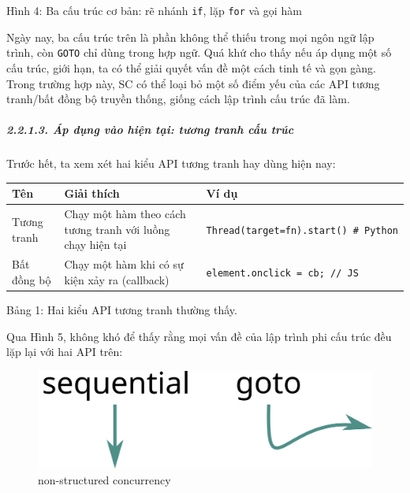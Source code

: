 \documentclass[
]{article}
\begin{document}
Hình 4: Ba cấu trúc cơ bản: rẽ nhánh \texttt{if}, lặp \texttt{for} và
gọi hàm

Ngày nay, ba cấu trúc trên là phần không thể thiếu trong mọi ngôn ngữ
lập trình, còn \texttt{GOTO} chỉ dùng trong hợp ngữ. Quá khứ cho thấy
nếu áp dụng một số cấu trúc, giới hạn, ta có thể giải quyết vấn đề một
cách tinh tế và gọn gàng. Trong trường hợp này, SC có thể loại bỏ một số
điểm yếu của các API tương tranh/bất đồng bộ truyền thống, giống cách
lập trình cấu trúc đã làm.

\hypertarget{uxe1p-dux1ee5ng-vuxe0o-hiux1ec7n-tux1ea1i-tux1b0ux1a1ng-tranh-cux1ea5u-truxfac}{%
\subparagraph{2.2.1.3. Áp dụng vào hiện tại: tương tranh cấu
trúc}\label{uxe1p-dux1ee5ng-vuxe0o-hiux1ec7n-tux1ea1i-tux1b0ux1a1ng-tranh-cux1ea5u-truxfac}}

Trước hết, ta xem xét hai kiểu API tương tranh hay dùng hiện nay:

\begin{longtable}[]{@{}
  >{\raggedright\arraybackslash}p{}
  >{\raggedright\arraybackslash}p{}
  >{\raggedright\arraybackslash}p{}@{}}
\toprule
Tên & Giải thích & Ví dụ \\
\midrule
\endhead
Tương tranh & Chạy một hàm theo cách tương tranh với luồng chạy hiện tại
& \texttt{Thread(target=fn).start()\ \#\ Python} \\
Bất đồng bộ & Chạy một hàm khi có sự kiện xảy ra (callback) &
\texttt{element.onclick\ =\ cb;\ //\ JS} \\
\bottomrule
\end{longtable}

Bảng 1: Hai kiểu API tương tranh thường thấy.

Qua Hình 5, không khó để thấy rằng mọi vấn đề của lập trình phi cấu trúc
đều lặp lại với hai API trên:

\begin{figure}
\centering
\includegraphics{../images/sequential-and-go-to-schematic.svg}
\caption{non-structured concurrency}
\end{figure}
\end{document}
